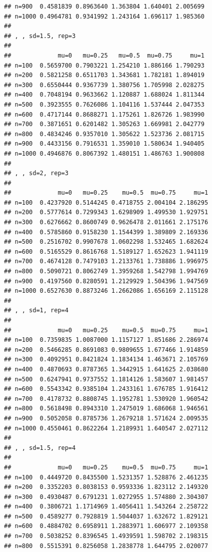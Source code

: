 \documentclass[11pt,a4paper]{article}
\begin{document}
\begin{verbatim}
## n=900  0.4581839 0.8963640 1.363804 1.640401 2.005699
## n=1000 0.4964781 0.9341992 1.243164 1.696117 1.985360
## 
## , , sd=1.5, rep=3
## 
##             mu=0   mu=0.25   mu=0.5  mu=0.75     mu=1
## n=100  0.5659700 0.7903221 1.254210 1.886166 1.790293
## n=200  0.5821258 0.6511703 1.343681 1.782181 1.894019
## n=300  0.6550444 0.9367739 1.380756 1.705998 2.028275
## n=400  0.7048194 0.9633662 1.120887 1.688024 1.811344
## n=500  0.3923555 0.7626086 1.104116 1.537444 2.047353
## n=600  0.4717144 0.8688271 1.175261 1.826726 1.983990
## n=700  0.3871651 0.6201482 1.305263 1.669981 2.042779
## n=800  0.4834246 0.9357010 1.305622 1.523736 2.081715
## n=900  0.4433156 0.7916531 1.359010 1.580634 1.940405
## n=1000 0.4946876 0.8067392 1.480151 1.486763 1.900808
## 
## , , sd=2, rep=3
## 
##             mu=0   mu=0.25    mu=0.5  mu=0.75     mu=1
## n=100  0.4237920 0.5144245 0.4718755 2.004104 2.186295
## n=200  0.5777614 0.7299343 1.6298909 1.499530 1.929751
## n=300  0.6276662 0.8600749 0.9626478 2.011661 2.175176
## n=400  0.5785860 0.9158230 1.1544399 1.389809 2.169336
## n=500  0.2516702 0.9907678 1.0602298 1.532465 1.682624
## n=600  0.5165529 0.8616768 1.5189127 1.652623 1.941119
## n=700  0.4674128 0.7479103 1.2133761 1.738886 1.996975
## n=800  0.5090721 0.8062749 1.3959268 1.542798 1.994769
## n=900  0.4197560 0.8280591 1.2129929 1.504396 1.947569
## n=1000 0.6527630 0.8873246 1.2662086 1.656169 2.115128
## 
## , , sd=1, rep=4
## 
##             mu=0   mu=0.25    mu=0.5  mu=0.75     mu=1
## n=100  0.7359835 1.0087000 1.1157127 1.851686 2.286974
## n=200  0.5466285 0.8691083 0.9809655 1.677466 1.914859
## n=300  0.4092951 0.8421824 1.1834134 1.463671 2.105769
## n=400  0.4870693 0.8787365 1.3442915 1.641625 2.038680
## n=500  0.6247941 0.9737552 1.1814126 1.583607 1.981457
## n=600  0.5543342 0.9385104 1.2433161 1.676785 1.916412
## n=700  0.4178732 0.8808745 1.1952781 1.530920 1.960542
## n=800  0.5618498 0.8943310 1.2475019 1.686068 1.946561
## n=900  0.5052058 0.8785736 1.2679218 1.571624 2.009535
## n=1000 0.4550461 0.8622264 1.2189931 1.640547 2.027112
## 
## , , sd=1.5, rep=4
## 
##             mu=0   mu=0.25    mu=0.5  mu=0.75     mu=1
## n=100  0.4449720 0.8435500 1.5231357 1.528876 2.461235
## n=200  0.3352203 0.8038153 0.9593336 1.823112 2.149320
## n=300  0.4930487 0.6791231 1.0272955 1.574880 2.304307
## n=400  0.3806721 1.1714969 1.4056411 1.543264 2.258722
## n=500  0.4589277 0.7928819 1.5044037 1.632672 1.829121
## n=600  0.4884702 0.6958911 1.2883971 1.606977 2.109358
## n=700  0.5038252 0.8396545 1.4939591 1.598702 2.198315
## n=800  0.5515391 0.8256058 1.2838778 1.644795 2.020077

\end{verbatim}
\end{document}
